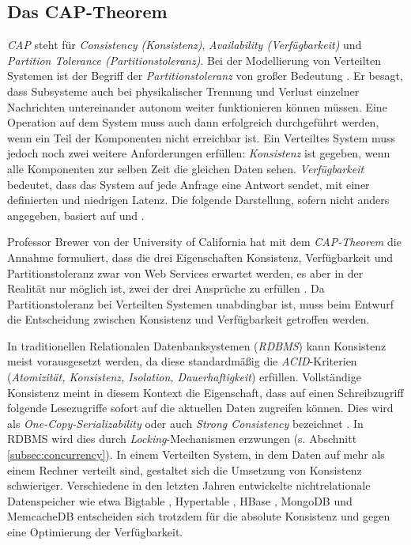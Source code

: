 \subsection{Das CAP-Theorem}
\label{subsec:cap}

\textit{CAP} steht für \textit{Consistency (Konsistenz)}, \textit{Availability (Verfügbarkeit)} und \textit{Partition Tolerance (Partitionstoleranz)}. Bei der Modellierung von Verteilten Systemen ist der Begriff der \textit{Partitionstoleranz} von großer Bedeutung . Er besagt, dass Subsysteme auch bei physikalischer Trennung und Verlust einzelner Nachrichten untereinander autonom weiter funktionieren können müssen. Eine Operation auf dem System muss auch dann erfolgreich durchgeführt werden, wenn ein Teil der Komponenten nicht erreichbar ist. Ein Verteiltes System muss jedoch noch zwei weitere Anforderungen erfüllen: \textit{Konsistenz} ist gegeben, wenn alle Komponenten zur selben Zeit die gleichen Daten sehen. \textit{Verfügbarkeit} bedeutet, dass das System auf jede Anfrage eine Antwort sendet, mit einer definierten und niedrigen Latenz. Die folgende Darstellung, sofern nicht anders angegeben, basiert auf  und .

Professor Brewer von der University of California hat mit dem \textit{CAP-Theorem} die Annahme formuliert, dass die drei Eigenschaften Konsistenz, Verfügbarkeit und Partitionstoleranz zwar von Web Services erwartet werden, es aber in der Realität nur möglich ist, zwei der drei Ansprüche zu erfüllen . Da Partitionstoleranz bei Verteilten Systemen unabdingbar ist, muss beim Entwurf die Entscheidung zwischen Konsistenz und Verfügbarkeit getroffen werden.

In traditionellen Relationalen Datenbanksystemen (\textit{RDBMS}) kann Konsistenz meist vorausgesetzt werden, da diese standardmäßig die \textit{ACID}-Kriterien (\textit{Atomizität, Konsistenz, Isolation, Dauerhaftigkeit}) erfüllen. Vollständige Konsistenz meint in diesem Kontext die Eigenschaft, dass auf einen Schreibzugriff folgende Lesezugriffe sofort auf die aktuellen Daten zugreifen können. Dies wird als \textit{One-Copy-Serializability} oder auch \textit{Strong Consistency} bezeichnet . In RDBMS wird dies durch \textit{Locking}-Mechanismen erzwungen (s. Abschnitt \ref{subsec:concurrency}). In einem Verteilten System, in dem Daten auf mehr als einem Rechner verteilt sind, gestaltet sich die Umsetzung von Konsistenz schwieriger. Verschiedene in den letzten Jahren entwickelte nichtrelationale Datenspeicher wie etwa Bigtable , Hypertable \cite{hypertable:website}, HBase \cite{hbase:website}, MongoDB \cite{mongodb:website} und MemcacheDB \cite{memcachedb:website} entscheiden sich trotzdem für die absolute Konsistenz und gegen eine Optimierung der Verfügbarkeit. 

